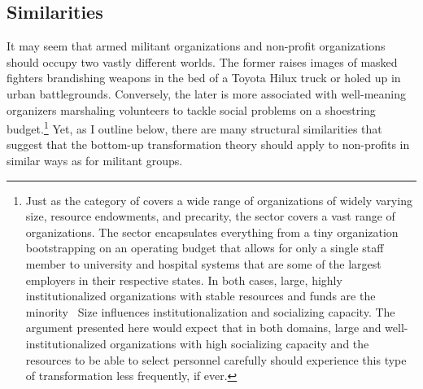 
\subsection{Similarities}

It may seem that armed militant organizations and non-profit organizations should occupy two vastly different worlds. The former raises images of masked fighters brandishing weapons in the bed of a Toyota Hilux truck or holed up in urban battlegrounds. Conversely, the later is more associated with well-meaning organizers marshaling volunteers to tackle social problems on a shoestring budget.\footnote{Just as the category of  covers a wide range of organizations of widely varying size, resource endowments, and precarity, the  sector covers a vast range of organizations. The sector encapsulates everything from a tiny organization bootstrapping on an operating budget that allows for only a single staff member to university and hospital systems that are some of the largest employers in their respective states. In both cases, large, highly institutionalized organizations with stable resources and funds are the minority~\autocite{cunningham2013non, frailey201looklike} Size influences institutionalization and socializing capacity. The argument presented here would expect that in both domains, large and well-institutionalized organizations with high socializing capacity and the resources to be able to select personnel carefully should experience this type of transformation less frequently, if ever.} Yet, as I outline below, there are many structural similarities that suggest that the bottom-up transformation theory should apply to non-profits in similar ways as for militant groups. 
 

